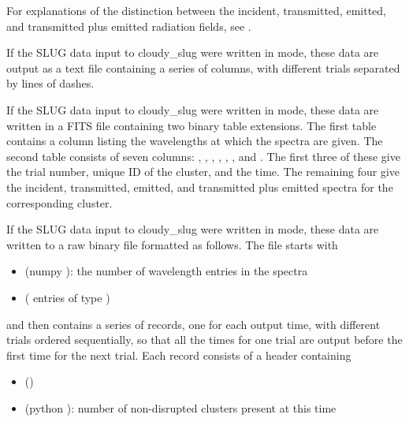 \documentclass[letterpaper,10pt,english]{sphinxmanual}
\begin{document}
For explanations of the distinction between the incident, transmitted,
emitted, and transmitted plus emitted radiation fields, see
{\hyperref[cloudy:sssec-int-cloudyspec-file]{\emph{}}}.

If the SLUG data input to cloudy\_slug were written in  mode,
these data are output as a text file containing a series of columns,
with different trials separated by lines of dashes.

If the SLUG data input to cloudy\_slug were written in  mode,
these data are written in a FITS file containing two binary table
extensions. The first table contains a column  listing
the wavelengths at which the spectra are given. The second table
consists of seven columns: , , ,
, , ,
and . The first three of these
give the trial number, unique ID of the cluster, and the time. The
remaining four give the incident, transmitted, emitted, and
transmitted plus emitted spectra for the corresponding cluster.

If the SLUG data input to cloudy\_slug were written in  mode,
these data are written to a raw binary file formatted as follows. The
file starts with
\begin{itemize}
\item {} 
 (numpy ): the number of wavelength entries in the spectra

\item {} 
 ( entries of type )

\end{itemize}

and then contains a series of records, one for each output time, with
different trials ordered sequentially, so that all the times for one
trial are output before the first time for the next trial. Each record
consists of a header containing
\begin{itemize}
\item {} 
 ()

\item {} 
 (python ): number of non-disrupted clusters present at this time

\end{itemize}
\end{document}
